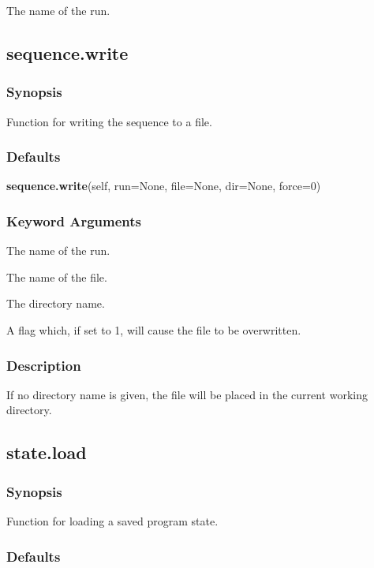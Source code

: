   The name of the run.


\newpage

\subsection{sequence.write}


\subsubsection{Synopsis}

Function for writing the sequence to a file.

\subsubsection{Defaults}

\textsf{\textbf{sequence.write}(self, run=None, file=None, dir=None, force=0)}


\subsubsection{Keyword Arguments}


  The name of the run.

  The name of the file.

  The directory name.

  A flag which, if set to 1, will cause the file to be overwritten.

\subsubsection{Description}

If no directory name is given, the file will be placed in the current working directory.


\newpage

\subsection{state.load}


\subsubsection{Synopsis}

Function for loading a saved program state.

\subsubsection{Defaults}

